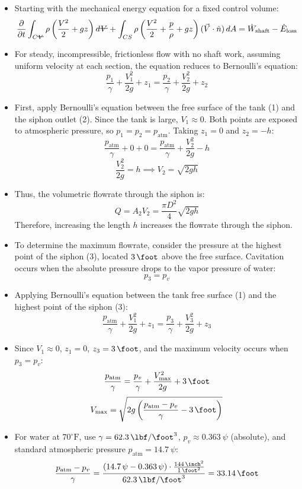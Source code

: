 ﻿\documentclass[12pt]{article}
\newcommand{\vol}{\mathord{\text{\ooalign{\hidewidth $V$\hidewidth\cr\kern-0.5pt\raisebox{0.8ex}{\rule[0pt]{1em}{0.5pt}}}}}}
\begin{document}
\begin{itemize}
    \item Starting with the mechanical energy equation for a fixed control volume:
    \[\frac{\partial}{\partial t}\int_{C\vol}\rho\left(\frac{V^2}{2}+gz\right)d\vol+\int_{CS}\rho\left(\frac{V^2}{2}+\frac{p}{\rho}+gz\right)(\vec{V}\cdot\hat{n})\,dA=\dot{W}_{\mathrm{shaft}}-\dot{E}_{\mathrm{loss}}\]
    \item For steady, incompressible, frictionless flow with no shaft work, assuming uniform velocity at each section, the equation reduces to Bernoulli's equation:
    \[\frac{p_1}{\gamma}+\frac{V_1^2}{2g}+z_1=\frac{p_2}{\gamma}+\frac{V_2^2}{2g}+z_2\]
    \item First, apply Bernoulli's equation between the free surface of the tank (1) and the siphon outlet (2). Since the tank is large, $V_1\approx0$. Both points are exposed to atmospheric pressure, so $p_1=p_2=p_{\mathrm{atm}}$. Taking $z_1=0$ and $z_2=-h$:
    \[\frac{p_{\mathrm{atm}}}{\gamma}+0+0=\frac{p_{\mathrm{atm}}}{\gamma}+\frac{V_2^2}{2g}-h\]
    \[\frac{V_2^2}{2g}=h\implies V_2=\sqrt{2gh}\]
    \item Thus, the volumetric flowrate through the siphon is:
    \[Q=A_2V_2=\boxed{\frac{\pi D^2}{4}\sqrt{2gh}}\]
    Therefore, increasing the length $h$ increases the flowrate through the siphon.
    \item To determine the maximum flowrate, consider the pressure at the highest point of the siphon (3), located $\SI{3}{\foot}$ above the free surface. Cavitation occurs when the absolute pressure drops to the vapor pressure of water:
    \[p_3=p_v\]
    \item Applying Bernoulli's equation between the tank free surface (1) and the highest point of the siphon (3):
    \[\frac{p_{\mathrm{atm}}}{\gamma}+\frac{V_1^2}{2g}+z_1=\frac{p_3}{\gamma}+\frac{V_3^2}{2g}+z_3\]
    \item Since $V_1\approx0$, $z_1=0$, $z_3=\SI{3}{\foot}$, and the maximum velocity occurs when $p_3=p_v$:
    \[\frac{p_{\mathrm{atm}}}{\gamma}=\frac{p_v}{\gamma}+\frac{V_{\max}^2}{2g}+\SI{3}{\foot}\]
    \[V_{\max}=\sqrt{2g\left(\frac{p_{\mathrm{atm}}-p_v}{\gamma}-\SI{3}{\foot}\right)}\]
    \item For water at $70^\circ\mathrm{F}$, use $\gamma=\SI{62.3}{\lbf\per\foot\cubed}$, $p_v\approx\SI{0.363}{\psi}$ (absolute), and standard atmospheric pressure $p_{\mathrm{atm}}=\SI{14.7}{\psi}$:
    \[\frac{p_{\mathrm{atm}}-p_v}{\gamma}=\frac{(\SI{14.7}{\psi}-\SI{0.363}{\psi})\cdot\frac{\SI{144}{\inch\squared}}{\SI{1}{\foot\squared}}}{\SI{62.3}{\lbf\per\foot\cubed}}=\SI{33.14}{\foot}\]

\end{itemize}
\end{document}
